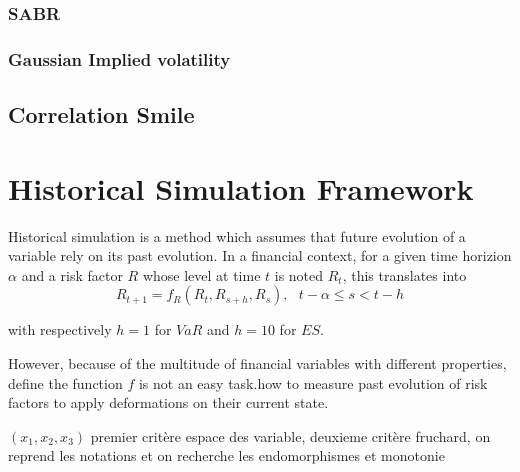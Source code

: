 \documentclass[3pt]{article}
\begin{document}
\subsubsection{SABR}

\subsubsection{Gaussian Implied volatility}

\bigskip

\subsection{Correlation Smile}

\bigskip

\bigskip

\bigskip

\bigskip

\bigskip

\bigskip

\bigskip

\bigskip

\bigskip

\bigskip

\bigskip

\bigskip

\section{Historical Simulation Framework}

Historical simulation is a method which assumes that future evolution of a
variable rely on its past evolution. In a financial context, for a given
time horizion $\alpha $ and a risk factor $R$ whose level at time $t$ is
noted $R_{t}$, this translates into 
\begin{equation*}
R_{t+1}=f_{R}(R_{t},R_{s+h},R_{s}),\text{ \ \ }t-\alpha \leq s<t-h
\end{equation*}

with respectively $h=1$ for $VaR$ and $h=10$ for $ES$.

\bigskip

However, because of the multitude of financial variables with different
properties, define the function $f$ is not an easy task.how to measure past
evolution of risk factors to apply deformations on their current state.

\bigskip $(x_{1},x_{2},x_{3})$ premier crit\`{e}re espace des variable,
deuxieme crit\`{e}re fruchard, on reprend les notations et on recherche les
endomorphismes et monotonie
\end{document}
